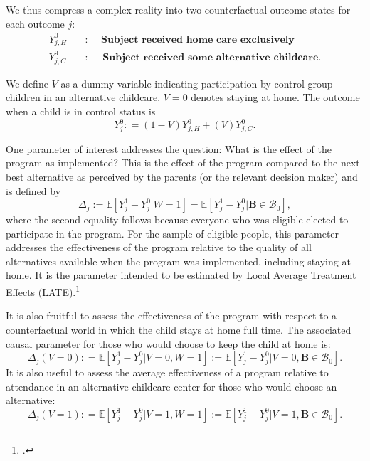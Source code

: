 We thus compress a complex reality into two counterfactual outcome states for each outcome $j$:
\begin{align*}
Y_{j,H}^0 \quad &: \quad \textbf{ Subject received home care exclusively} \\
Y_{j,C}^0 \quad &: \quad \textbf{ Subject received some alternative childcare}.
\end{align*}

We define $V$ as a dummy variable indicating participation by control-group children in an alternative childcare. $V=0$ denotes staying at home. The outcome when a child is in control status is
\begin{equation}
Y_{j}^0 : = \left( 1 - V \right) Y_{j,H}^0 + \left( V \right) Y_{j,C}^0. \label{eq:meandiff}
\end{equation}

One parameter of interest addresses the question: What is the effect of the program as implemented? This is the effect of the program compared to the next best alternative as perceived by the parents (or the relevant decision maker) and is defined by
\begin{equation}\label{eq:effect}
\Delta_j := \mathbb{E} \left[ Y_{j}^1 -  Y_{j}^0 | W =1 \right] = \mathbb{E} \left[Y_{j}^1 -  Y_{j}^0 | \bm{B} \in \mathcal{B}_0 \right],
\end{equation}
where the second equality follows because everyone who was eligible elected to participate in the program. For the sample of eligible people, this parameter addresses the effectiveness of the program relative to the quality of all alternatives available when the program was implemented, including staying at home. It is the parameter intended to be estimated by Local Average Treatment Effects (LATE).\footnote{\citealp{Imbens_Angrist_1994_Econometrica}.}

It is also fruitful to assess the effectiveness of the program with respect to a counterfactual world in which the child stays at home full time. The associated causal parameter for those who would choose to keep the child at home is:
\begin{equation}\label{eq:cont1}
\Delta_j \left(V = 0 \right) : =   \mathbb{E} \left[ Y_{j}^1 -  Y_{j}^0 | V = 0, W = 1 \right] := \mathbb{E} \left[Y_{j}^1 -  Y_{j}^0 | V = 0, \bm{B} \in \mathcal{B}_0 \right].
\end{equation}
It is also useful to assess the average effectiveness of a program relative to attendance in an alternative childcare center for those who would choose an alternative:
\begin{equation}\label{eq:cont2}
\Delta_j \left( V =1 \right) : =   \mathbb{E} \left[ Y_{j}^1 -  Y_{j}^0 | V = 1, W = 1 \right] := \mathbb{E} \left[ Y_{j}^1 -  Y_{j}^0 | V = 1, \bm{B} \in \mathcal{B}_0 \right].
\end{equation}


